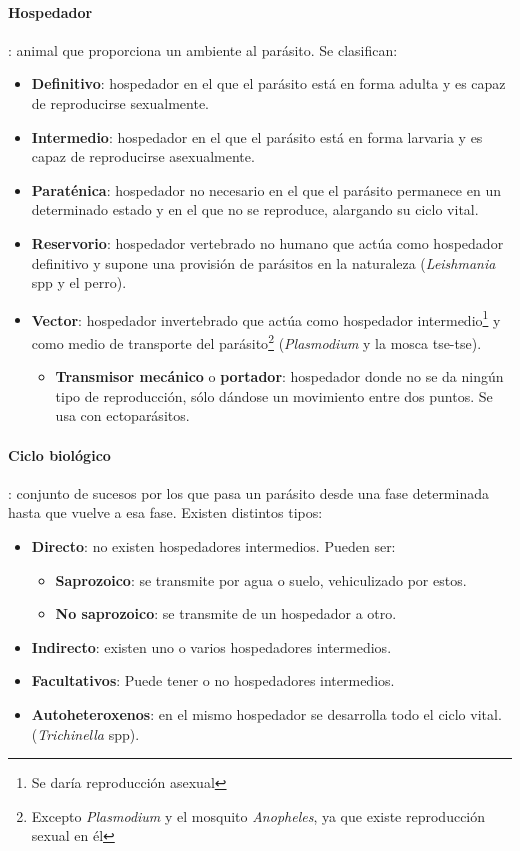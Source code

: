 \paragraph{Hospedador}: animal que proporciona un ambiente al parásito. Se clasifican:
	\begin{itemize}[itemsep=0pt,parsep=0pt,topsep=0pt,partopsep=0pt]
		\item \textbf{Definitivo}: hospedador en el que el parásito está en forma adulta y es capaz de reproducirse sexualmente.
		\item\textbf{Intermedio}: hospedador en el que el parásito está en forma larvaria y es capaz de reproducirse asexualmente.
		\item\textbf{Paraténica}: hospedador no necesario en el que el parásito permanece en un determinado estado y en el que no se reproduce, alargando su ciclo vital.
		\item\textbf{Reservorio}: hospedador vertebrado no humano que actúa como hospedador definitivo y supone una provisión de parásitos en la naturaleza (\textit{Leishmania} spp y el perro).
		\item\textbf{Vector}: hospedador invertebrado que actúa como hospedador intermedio\footnote{Se daría reproducción asexual} y como medio de transporte del parásito\footnote{Excepto \textit{Plasmodium} y el mosquito \textit{Anopheles}, ya que existe reproducción sexual en él} (\textit{Plasmodium} y la mosca tse-tse).
		\begin{itemize}[itemsep=0pt,parsep=0pt,topsep=0pt,partopsep=0pt]
			\item \textbf{Transmisor mecánico} o \textbf{portador}: hospedador donde no se da ningún tipo de reproducción, sólo dándose un movimiento entre dos puntos. Se usa con ectoparásitos.
		\end{itemize}
	\end{itemize}
\paragraph{Ciclo biológico}: conjunto de sucesos por los que pasa un parásito desde una fase determinada hasta que vuelve a esa fase. Existen distintos tipos:
\begin{itemize}[itemsep=0pt,parsep=0pt,topsep=0pt,partopsep=0pt]
	\item \textbf{Directo}: no existen hospedadores intermedios. Pueden ser:
	\begin{itemize}[itemsep=0pt,parsep=0pt,topsep=0pt,partopsep=0pt]
		\item \textbf{Saprozoico}: se transmite por agua o suelo, vehiculizado por estos.
		\item\textbf{No saprozoico}: se transmite de un hospedador a otro.
	\end{itemize}
	\item\textbf{Indirecto}: existen uno o varios hospedadores intermedios.
	\item\textbf{Facultativos}: Puede tener o no hospedadores intermedios.
	\item\textbf{Autoheteroxenos}: en el mismo hospedador se desarrolla todo el ciclo vital. (\textit{Trichinella} spp).
\end{itemize}
